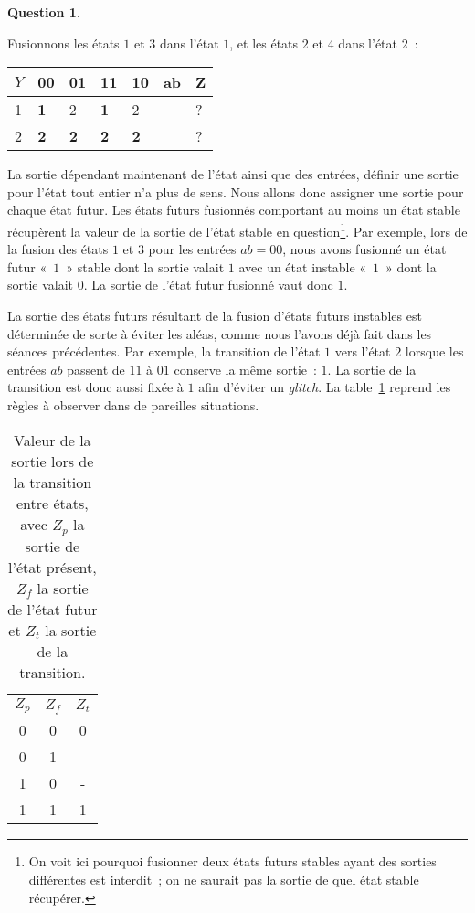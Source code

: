 \documentclass[11pt,a4paper]{article}
\theoremstyle{definition}%
\newtheorem{Q}{Question}[] %
\begin{document}
\begin{Q}
{\begin{enumerate}
		Fusionnons les états $1$ et $3$ dans l'état $1$, et les états $2$ et $4$ dans l'état $2$~:
		\begin{center}
		\begin{tabular}{|l|l|l|l|l|l|l|}
		\hline
		$Y$ & 00         & 01         & 11         & 10         & ab & Z \\ \hline
		1           & \textbf{1} & 2          & \textbf{1}          & 2          &    & ? \\ \cline{1-5} \cline{7-7}
		2           & \textbf{2}          & \textbf{2} & \textbf{2} & \textbf{2} &    & ? \\ \cline{1-5} \cline{7-7}
		\end{tabular}
		\end{center}

		La sortie dépendant maintenant de l'état ainsi que des entrées, définir une sortie pour l'état tout entier n'a plus de sens.
		Nous allons donc assigner une sortie pour chaque état futur.
		Les états futurs fusionnés comportant au moins un état stable récupèrent la valeur de la sortie de l'état stable en question\footnote{On voit ici pourquoi fusionner deux états futurs stables ayant des sorties différentes est interdit~; on ne saurait pas la sortie de quel état stable récupérer.}.
		Par exemple, lors de la fusion des états $1$ et $3$ pour les entrées $ab = 00$, nous avons fusionné un état futur «~$1$~» stable dont la sortie valait $1$ avec un état instable «~$1$~» dont la sortie valait $0$.
		La sortie de l'état futur fusionné vaut donc $1$.

		La sortie des états futurs résultant de la fusion d'états futurs instables est déterminée de sorte à éviter les aléas, comme nous l'avons déjà fait dans les séances précédentes.
		Par exemple, la transition de l'état $1$ vers l'état $2$ lorsque les entrées $ab$ passent de $11$ à $01$ conserve la même sortie~: $1$.
		La sortie de la transition est donc aussi fixée à $1$ afin d'éviter un \textit{glitch}. La table~\ref{tab:sortie-transition} reprend les règles à observer dans de pareilles situations.
		\begin{table}[H]
			\centering
			\begin{tabular}{ccc}
			$Z_p$ & $Z_f$ & $Z_t$ \\ \hline
			0 & 0 & 0 \\
			0 & 1 & - \\
			1 & 0 & - \\
			1 & 1 & 1 \\
			\end{tabular}
			\caption{Valeur de la sortie lors de la transition entre états, avec $Z_p$ la sortie de l'état présent, $Z_f$ la sortie de l'état futur et $Z_t$ la sortie de la transition.}
			\label{tab:sortie-transition}
		\end{table}



\end{enumerate}}
\end{Q}
\end{document}
